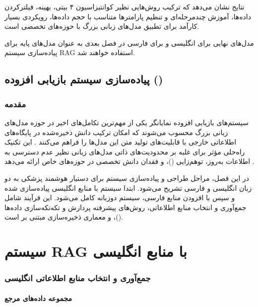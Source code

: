 \documentclass[11pt, a4paper, oneside]{book}
\begin{document}
	نتایج نشان می‌دهد که ترکیب روش‌هایی نظیر کوانتیزاسیون ۴ بیتی، \texttt{} بهینه، فیلترکردن داده‌ها، آموزش چندمرحله‌ای و تنظیم پارامترها متناسب با حجم داده‌ها، رویکردی بسیار کارآمد برای تطبیق مدل‌های زبانی بزرگ با حوزه‌های تخصصی است.

	مدل‌های نهایی  برای انگلیسی و  برای فارسی در فصل بعدی به عنوان مدل‌های پایه برای پیاده‌سازی سیستم RAG استفاده خواهند شد.

	
	\chapter{پیاده‌سازی سیستم بازیابی افزوده ()}

	\section{مقدمه}

	سیستم‌های بازیابی افزوده نمایانگر یکی از مهم‌ترین تکامل‌های اخیر در حوزه مدل‌های زبانی بزرگ محسوب می‌شوند که امکان ترکیب دانش ذخیره‌شده در پایگاه‌های اطلاعاتی خارجی با قابلیت‌های تولید متن این مدل‌ها را فراهم می‌کنند \cite{lewis_retrieval-augmented_2021}. این تکنیک راه‌حلی مؤثر برای غلبه بر محدودیت‌های ذاتی مدل‌های زبانی نظیر عدم دسترسی به اطلاعات به‌روز، توهم‌زایی ()، و فقدان دانش تخصصی در حوزه‌های خاص ارائه می‌دهد \cite{gao_retrieval-augmented_2024}.

	در این فصل، مراحل طراحی و پیاده‌سازی سیستم  برای دستیار هوشمند پزشکی به دو زبان انگلیسی و فارسی تشریح می‌شود. ابتدا سیستم  با منابع انگلیسی پیاده‌سازی شده و سپس با افزودن منابع فارسی، سیستم دوزبانه کامل می‌شود. این فرآیند شامل جمع‌آوری و انتخاب منابع اطلاعاتی، روش‌های پیشرفته پردازش و تکه‌تکه‌سازی داده‌ها ()، و معماری ذخیره‌سازی مبتنی بر  است.

	\part{سیستم RAG با منابع انگلیسی}

	\section{جمع‌آوری و انتخاب منابع اطلاعاتی انگلیسی}

	\subsection{مجموعه داده‌های مرجع }
\end{document}

